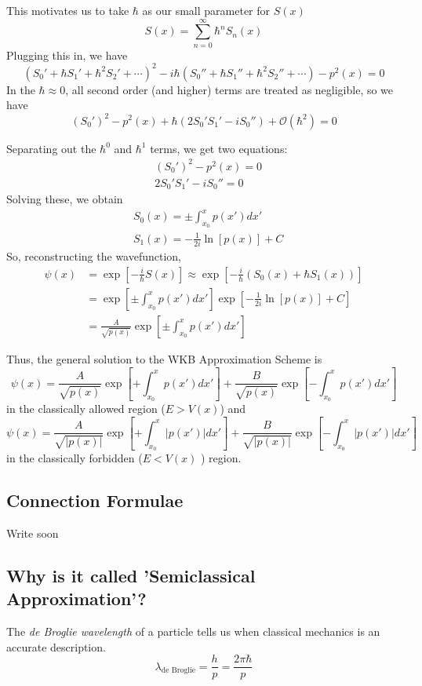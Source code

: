 \documentclass{article}
\begin{document}
This motivates us to take $\hbar$ as our small parameter for $S(x)$ \[ S(x) = \sum_{n = 0}^{\infty} \hbar^n S_n(x) \] Plugging this in, we have \[  \left(S_0' +  \hbar S_1' + \hbar^2 S_2' + \cdots\right)^2 - i\hbar\left(S_0'' + \hbar S_1'' + \hbar^2 S_2'' + \cdots \right) - p^2(x) = 0  \] In the $\hbar \approx 0$, all second order (and higher) terms are treated as negligible, so we have \[ \left(S_0'\right)^2 - p^2(x) + \hbar\left(2S_0'S_1' - iS_0''\right) + \mathcal{O}(\hbar^2) = 0  \]


\vskip 0.5cm
Separating out the $\hbar^0$ and $\hbar^1$ terms, we get two equations:\begin{align*}
  &\left(S_0'\right)^2 - p^2(x) = 0 \\
  &2S_0'S_1' - iS_0'' = 0
\end{align*} Solving these, we obtain \begin{align*}
  &S_0(x) = \pm\int_{x_0}^{x} p(x') dx'\\
  &S_1(x) = -\frac{1}{2i} \ln\left[p(x)\right] + C
\end{align*} So, reconstructing the wavefunction, \begin{align*}
  \psi(x) &= \exp\left[-\frac{i}{\hbar}S(x)\right] \approx \exp\left[-\frac{i}{\hbar} \left(S_0(x) + \hbar S_1(x)\right) \right] \\
  &= \exp\left[ \pm\int_{x_0}^{x} p(x') dx' \right] \exp\left[ -\frac{1}{2i} \ln\left[p(x)\right] + C \right] \\
  &= \frac{A}{\sqrt{p(x)}} \exp\left[ \pm\int_{x_0}^{x} p(x') dx' \right]
\end{align*}

\vskip 1cm
Thus, the general solution to the WKB Approximation Scheme is \[ \boxed{ \psi(x) = \frac{A}{\sqrt{p(x)}} \exp\left[ + \int_{x_0}^{x} p(x') dx' \right] + \frac{B}{\sqrt{p(x)}} \exp\left[ -\int_{x_0}^{x} p(x') dx' \right] }  \] in the classically allowed region ($E > V(x)$) and \[ \boxed{ \psi(x) = \frac{A}{\sqrt{|p(x)|}} \exp\left[ + \int_{x_0}^{x} |p(x')| dx' \right] + \frac{B}{\sqrt{|p(x)|}} \exp\left[ -\int_{x_0}^{x} |p(x')| dx' \right] }  \] in the classically forbidden ($E < V(x)$ ) region.



\subsection{Connection Formulae}
Write soon

\vskip 0.5cm
\subsection*{Why is it called 'Semiclassical Approximation'?}
The \emph{de Broglie wavelength} of a particle tells us when classical mechanics is an accurate description. 
\[ \lambda_{\text{de Broglie}} = \frac{h}{p} = \frac{2\pi \hbar}{p} \]
\end{document}
